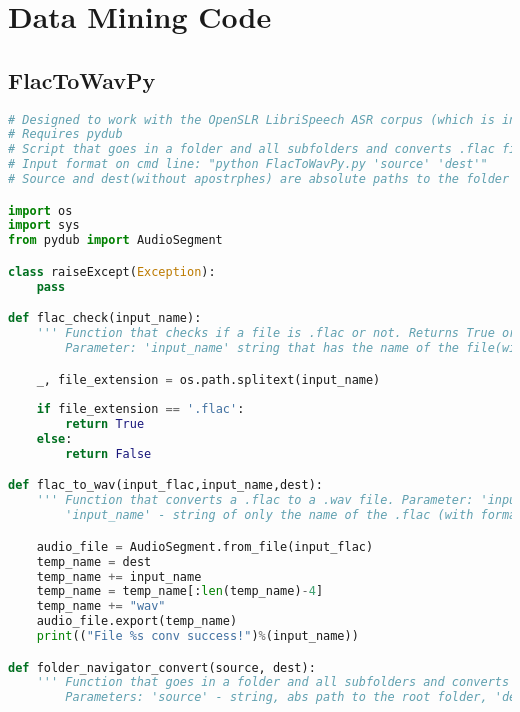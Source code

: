 \chapter{Data Mining Code}\label{ch:appDlabel}

\section{FlacToWavPy}
\begin{lstlisting}[language=Python, flexiblecolumns=true, caption=FlacToWavPy code.]
# Designed to work with the OpenSLR LibriSpeech ASR corpus (which is in .flac)
# Requires pydub
# Script that goes in a folder and all subfolders and converts .flac files into .wav files. Can be imported as module or run directly from command line.
# Input format on cmd line: "python FlacToWavPy.py 'source' 'dest'"         
# Source and dest(without apostrphes) are absolute paths to the folder containing the .flac files and the folder to put the converted .wav files respecively 

import os
import sys
from pydub import AudioSegment

class raiseExcept(Exception):
    pass

def flac_check(input_name):
    ''' Function that checks if a file is .flac or not. Returns True or False (bool)
        Parameter: 'input_name' string that has the name of the file(with format). It may work with absolute path and name (maybe) '''    

    _, file_extension = os.path.splitext(input_name)
        
    if file_extension == '.flac':   
        return True
    else:
        return False

def flac_to_wav(input_flac,input_name,dest):
    ''' Function that converts a .flac to a .wav file. Parameter: 'input_flac' - string abs path to a .flac, 
        'input_name' - string of only the name of the .flac (with format), 'dest' string abs path to destination folder (with a '/' in the end!) '''

    audio_file = AudioSegment.from_file(input_flac)
    temp_name = dest
    temp_name += input_name
    temp_name = temp_name[:len(temp_name)-4]
    temp_name += "wav"
    audio_file.export(temp_name)
    print(("File %s conv success!")%(input_name))

def folder_navigator_convert(source, dest):
    ''' Function that goes in a folder and all subfolders and converts .flac files into .wav files.
        Parameters: 'source' - string, abs path to the root folder, 'dest' - string, abs path to dest folder (both must be with a '/' at the end!) '''


\end{lstlisting}
